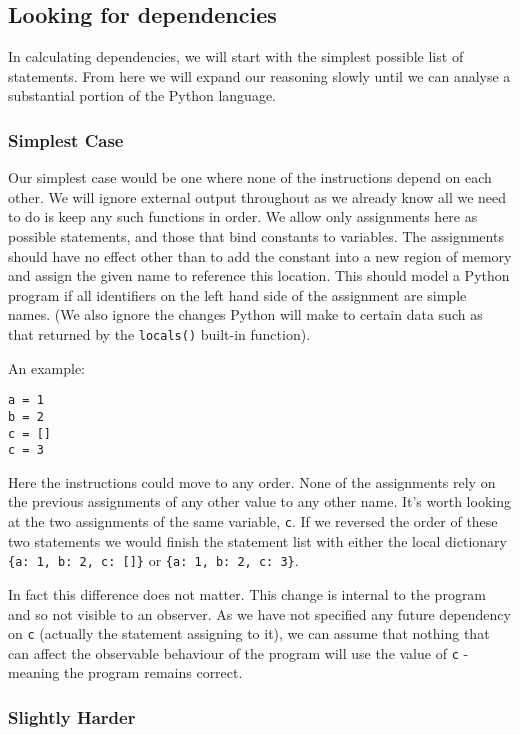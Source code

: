 \documentclass{report}
\begin{document}
\subsection{Looking for dependencies}

In calculating dependencies, we will start with the simplest possible list of statements. From here we will expand our reasoning slowly until
we can analyse a substantial portion of the Python language.

\subsubsection{Simplest Case}

Our simplest case would be one where none of the instructions depend on each other. We will ignore external output throughout as we already know
all we need to do is keep any such functions in order. We allow only assignments here as possible statements, and those that bind constants to
variables. The assignments should have no effect other than to add the constant into a new region of memory and assign the given name to
reference this location. This should model a Python program if all identifiers on the left hand side of the assignment are simple names.
(We also ignore the changes Python will make to certain data such as that returned by the \texttt{locals()} built-in function).

An example:

\begin{lstlisting}
a = 1
b = 2
c = []
c = 3
\end{lstlisting}

Here the instructions could move to any order. None of the assignments rely on the previous assignments of any other value to any other name. It's
worth looking at the two assignments of the same variable, \texttt{c}. If we reversed the order of these two statements we would finish the
statement list with either the local dictionary \texttt{\{a: 1, b: 2, c: []\}} or \texttt{\{a: 1, b: 2, c: 3\}}.

In fact this difference does not matter. This change is internal to the program and so not visible to an observer. As we have not specified
any future dependency on \texttt{c} (actually the statement assigning to it), we can assume that nothing that can affect the observable
behaviour of the program will use the value of \texttt{c} - meaning the program remains correct.

\subsubsection{Slightly Harder}
\end{document}
